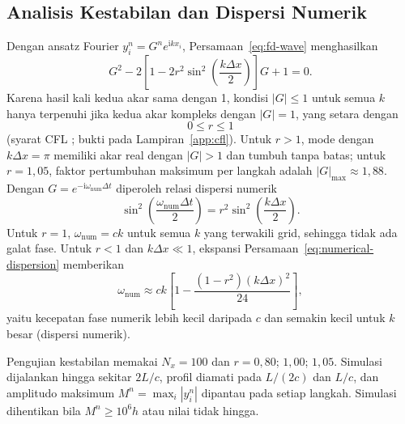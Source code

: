 \documentclass[aps,prl,twocolumn,superscriptaddress]{revtex4-2}
\begin{document}
    \subsection{Analisis Kestabilan dan Dispersi Numerik}

        Dengan ansatz Fourier $y_i^n=G^n e^{\mathrm{i}k x_i}$, Persamaan~\eqref{eq:fd-wave} menghasilkan
        \begin{equation}
            G^2 - 2\left[ 1-2r^2\sin^2\left(\frac{k\Delta x}{2}\right) \right] G+1=0.
            \label{eq:amplification}
        \end{equation}
        Karena hasil kali kedua akar sama dengan 1, kondisi $|G|\leq1$ untuk semua $k$ hanya terpenuhi jika kedua akar kompleks dengan $|G|=1$, yang setara dengan
        \begin{equation}
            0\leq r\leq 1
            \label{eq:cfl-condition}
        \end{equation}
        (syarat CFL \cite{CFL1928,Strikwerda2004}; bukti pada Lampiran~\ref{app:cfl}). 
        Untuk $r>1$, mode dengan $k\Delta x=\pi$ memiliki akar real dengan $|G|>1$ dan tumbuh tanpa batas; untuk $r=1{,}05$, faktor pertumbuhan maksimum per langkah adalah $|G|_{\max}\approx1{,}88$.
        Dengan $G=e^{-\mathrm{i}\omega_{\mathrm{num}}\Delta t}$ diperoleh relasi dispersi numerik
        \begin{equation}
            \sin^2 \left( \frac{\omega_{\mathrm{num}}\Delta t}{2} \right) = r^2\sin^2\left(\frac{k\Delta x}{2}\right).
            \label{eq:numerical-dispersion}
        \end{equation}
        Untuk $r=1$, $\omega_{\mathrm{num}}=ck$ untuk semua $k$ yang terwakili grid, sehingga tidak ada galat fase. 
        Untuk $r<1$ dan $k\Delta x\ll1$, ekspansi Persamaan~\eqref{eq:numerical-dispersion} memberikan
        \begin{equation}
            \omega_{\mathrm{num}}\approx ck\left[1-\frac{(1-r^2)(k\Delta x)^2}{24}\right],
            \label{eq:phase-error}
        \end{equation}
        yaitu kecepatan fase numerik lebih kecil daripada $c$ dan semakin kecil untuk $k$ besar (dispersi numerik).

        Pengujian kestabilan memakai $N_x=100$ dan $r=0{,}80$; $1{,}00$; $1{,}05$. 
        Simulasi dijalankan hingga sekitar $2L/c$, profil diamati pada $L/(2c)$ dan $L/c$, dan amplitudo maksimum $M^n=\max_i|y_i^n|$ dipantau pada setiap langkah. 
        Simulasi dihentikan bila $M^n\geq10^6h$ atau nilai tidak hingga.
\end{document}
